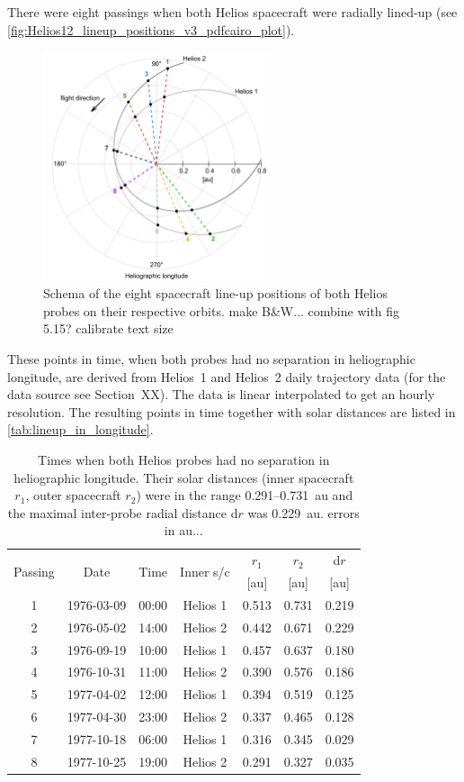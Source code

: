There were eight passings when both Helios spacecraft were radially lined-up (see \autoref{fig:Helios12_lineup_positions_v3_pdfcairo_plot}).
\begin{figure}[htb]
	\centering
	\includegraphics[width=0.6\textwidth]{images/gnuplots/Helios12_lineup_positions_v3_pdfcairo_plot.pdf}
	\caption{Schema of the eight spacecraft line-up positions of both Helios probes on their respective orbits. make B\&W... combine with fig 5.15? calibrate text size}
	\label{fig:Helios12_lineup_positions_v3_pdfcairo_plot}
\end{figure}
These points in time, when both probes had no separation in heliographic longitude, are derived from Helios~1 and Helios~2 daily trajectory data (for the data source see Section~XX). The data is linear interpolated to get an hourly resolution. The resulting points in time together with solar distances are listed in \autoref{tab:lineup_in_longitude}.
\begin{table}[htb]\small
	\centering
	\captionsetup{belowskip=4pt}
	\caption{Times when both Helios probes had no separation in heliographic longitude. Their solar distances (inner spacecraft $r_1$, outer spacecraft $r_2$) were in the range 0.291--0.731~au and the maximal inter-probe radial distance d$r$ was 0.229~au. errors in au...}
	\begin{tabular}{ccccccc}
		\toprule
		\multirow{2}{*}{Passing}	&\multirow{2}{*}{Date}	&\multirow{2}{*}{Time}	&\multirow{2}{*}{Inner s/c}	&$r_1$	&$r_2$	&d$r$\\
			&	&	&	&[au]	&[au]	&[au]\\
		\midrule
		1	&1976-03-09	&00:00	&Helios 1	&0.513	&0.731	&0.219\\
		2	&1976-05-02	&14:00	&Helios 2	&0.442	&0.671	&0.229\\
		3	&1976-09-19	&10:00	&Helios 1	&0.457	&0.637	&0.180\\
		4	&1976-10-31	&11:00	&Helios 2	&0.390	&0.576	&0.186\\
		5	&1977-04-02	&12:00	&Helios 1	&0.394	&0.519	&0.125\\
		6	&1977-04-30	&23:00	&Helios 2	&0.337	&0.465	&0.128\\
		7	&1977-10-18	&06:00	&Helios 1	&0.316	&0.345	&0.029\\
		8	&1977-10-25	&19:00	&Helios 2	&0.291	&0.327	&0.035\\
		\bottomrule
	\end{tabular}
	\label{tab:lineup_in_longitude}
\end{table}
